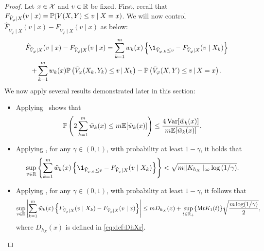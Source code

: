 \begin{proof}
  Let $x\in\mathcal{X}$ and $v\in\mathbb{R}$ be fixed.
  First, recall that $F_{\tilde{V}_{\varphi}\mid X}(v\mid x)= \mathbb{P}(V(X,Y)\le v\mid X=x)$.
  We will now control $\hat{F}_{\tilde{V}_{\varphi}\mid X}(v\mid x) - F_{\tilde{V}_{\varphi}\mid X}(v\mid x)$ as below:
  \begin{multline}\label{eq:eq:thm:uniform-cdf:2}
    \hat{F}_{\tilde{V}_{\varphi}\mid X}(v\mid x) - F_{\tilde{V}_{\varphi}\mid X}(v\mid x)
    = \sum_{k=1}^{\ccount} w_{k}(x) \ac{ \1_{\tilde{V}_{\varphi,k}\le v} -  F_{\tilde{V}_{\varphi}\mid X}(v\mid X_{k})}
    \\
    + \sum_{k=1}^{\ccount} w_{k}(x) \prob\pr{\tilde{V}_{\varphi}(X_{k},Y_{k}) \le v \,\vert\, X_{k} } - \prob\pr{\tilde{V}_{\varphi}(X,Y) \le v \,\vert\, X=x }.
  \end{multline}
  We now apply several results demonstrated later in this section:
  \begin{itemize}
    
    \item Applying~ shows that
    \begin{equation*}
      \mathbb{P}\left({2\sum_{k=1}^{m} \tilde{w}_{k}(x) \le m \mathbb{E}[\tilde{w}_k(x)]}\right)
      \le \frac{4 \operatorname{Var}[\tilde{w}_k(x)]}{m \mathbb{E}[\tilde{w}_k(x)]}.
    \end{equation*}

    \item Applying , for any $\gamma\in(0,1)$, with probability at least $1-\gamma$, it holds that
    \begin{equation*}
      \sup_{v\in\R} \ac{ \sum_{k=1}^{\ccount} \tilde{w}_{k}(x) \ac{ \1_{\tilde{V}_{\varphi,k}\le v} -  F_{\tilde{V}_{\varphi}\mid X}(v\mid X_{k})} } < \sqrt{ \ccount \normn{K_{h_{X}}}_{\infty} \log \pr{\nofrac{1}{\gamma}}}.
    \end{equation*}

    \item Applying , for any $\gamma\in(0,1)$, with probability at least $1-\gamma$, it follows that
    \begin{equation*}
      \sup_{v\in\mathbb{R}} \left\lvert{ \sum_{k=1}^{m} \tilde{w}_{k}(x) \left\{{
      F_{\tilde{V}_{\varphi}\mid X}(v \mid X_k) - F_{\tilde{V}_{\varphi}\mid X}(v \mid x)
      }\right\}}\right\rvert
      \le m D_{h_X}(x)
      + \sup_{t\in\mathbb{R}_+}\{{\mathrm{M} t K_{1}(t)}\} \sqrt{\frac{m \log(1/\gamma)}{2}}
      ,
    \end{equation*}
    where $D_{h_X}(x)$ is defined in \eqref{eq:def:DhXr}.


\end{itemize}
\end{proof}
